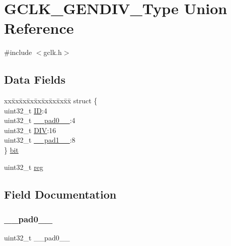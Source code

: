 \hypertarget{union_g_c_l_k___g_e_n_d_i_v___type}{}\section{G\+C\+L\+K\+\_\+\+G\+E\+N\+D\+I\+V\+\_\+\+Type Union Reference}
\label{union_g_c_l_k___g_e_n_d_i_v___type}


{\ttfamily \#include $<$gclk.\+h$>$}

\subsection*{Data Fields}
\begin{DoxyCompactItemize}
\item 
\begin{tabbing}
xx\=xx\=xx\=xx\=xx\=xx\=xx\=xx\=xx\=\kill
struct \{\\
\>uint32\_t \mbox{\hyperlink{union_g_c_l_k___g_e_n_d_i_v___type_a505f98fde467109a9b37b3c7e008df91}{ID}}:4\\
\>uint32\_t \mbox{\hyperlink{union_g_c_l_k___g_e_n_d_i_v___type_a3e57c2ef1c3ffb36722f000cc1156824}{\_\_pad0\_\_}}:4\\
\>uint32\_t \mbox{\hyperlink{union_g_c_l_k___g_e_n_d_i_v___type_a0d52084cbd3830501e344b05e6215b94}{DIV}}:16\\
\>uint32\_t \mbox{\hyperlink{union_g_c_l_k___g_e_n_d_i_v___type_a6712ba6dd1d5b43d2d56ff8ac4e275a7}{\_\_pad1\_\_}}:8\\
\} \mbox{\hyperlink{union_g_c_l_k___g_e_n_d_i_v___type_aa8e9ae1ef55fbc2923720c0fac765dab}{bit}}\\

\end{tabbing}\item 
uint32\+\_\+t \mbox{\hyperlink{union_g_c_l_k___g_e_n_d_i_v___type_a6b91636401516a477989a336376d7b40}{reg}}
\end{DoxyCompactItemize}


\subsection{Field Documentation}
\mbox{\label{union_g_c_l_k___g_e_n_d_i_v___type_a3e57c2ef1c3ffb36722f000cc1156824}} 
\subsubsection{\texorpdfstring{\_\_pad0\_\_}{\_\_pad0\_\_}}
{\footnotesize\ttfamily uint32\+\_\+t \+\_\+\+\_\+pad0\+\_\+\+\_\+}

